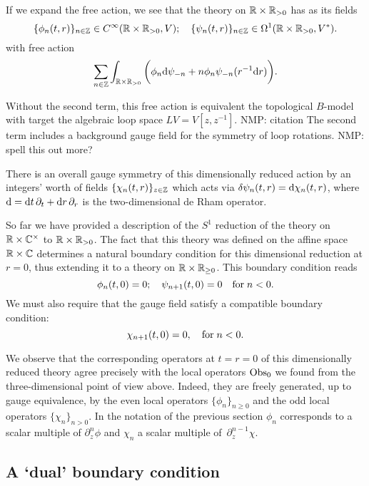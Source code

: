 \documentclass[11pt]{amsart}
\def\natalie#1{{\textcolor{green!65!black}{NMP: {#1}}}}
\begin{document}
If we expand the free action, we see that the theory on $\mathbb R \times \mathbb R_{>0}$ has as its fields 
\[
\{\phi_n(t,r)\}_{n \in \mathbb Z} \in C^\infty(\mathbb R \times \mathbb R_{>0} , V) ; \quad \{\psi_n (t,r)\}_{n \in \mathbb Z} \in \Omega^1 (\mathbb R \times \mathbb R_{>0}, V^*) .
\] 
with free action
\[
\sum_{n \in \mathbb Z} \int_{\mathbb R \times \mathbb R_{>0}} \bigg(\phi_n {\rm d} \psi_{-n} + n \phi_n \psi_{-n} (r^{-1} {\rm d} r)  \bigg).
\]

Without the second term, this free action is equivalent the topological $B$-model with target the algebraic loop space $L V = V[z,z^{-1}]$.  \natalie{citation}
The second term includes a background gauge field for the symmetry of loop rotations. \natalie{spell this out more?}

There is an overall gauge symmetry of this dimensionally reduced action by an integers' worth of fields $\{\chi_n (t,r)\}_{z \in \mathbb Z}$ which acts via $\delta \psi_n (t,r) = {\rm d} \chi_n (t,r)$, where ${\rm d} = {\rm d} t \,\partial_t + {\rm d} r \,\partial_r$ is the two-dimensional de Rham operator. 

So far we have provided a description of the $S^1$ reduction of the theory on $\mathbb R \times \mathbb C^\times$ to $\mathbb R \times \mathbb R_{>0}$. 
The fact that this theory was defined on the affine space $\mathbb R \times \mathbb C$ determines a natural boundary condition for this dimensional reduction at $r = 0$, thus extending it to a theory on $\mathbb R \times \mathbb R_{\geq 0}$. 
This boundary condition reads
\begin{equation}\label{eqn:bc1}
\phi_n (t, 0) = 0 ; \quad \psi_{n+1} (t,0) = 0 \quad {\rm for} \; n < 0 .
\end{equation}
We must also require that the gauge field satisfy a compatible boundary condition:
\begin{equation}\label{eqn:gbc1}
\chi_{n+1} (t,0) = 0, \quad {\rm for} \; n < 0 .
\end{equation}

We observe that the corresponding operators at $t = r = 0$ of this dimensionally reduced theory agree precisely with the local operators ${\rm Obs}_0$ we found from the three-dimensional point of view above. 
Indeed, they are freely generated, up to gauge equivalence, by the even local operators $\{\phi_n\}_{n \geq 0}$ and the odd local operators $\{\chi_n\}_{n > 0}$. 
In the notation of the previous section $\phi_n$ corresponds to a scalar multiple of $\partial_z^n \phi$ and $\chi_n$ a scalar multiple of~$\partial^{n-1}_z \chi$. 

\subsection*{A `dual' boundary condition} 
\end{document}
